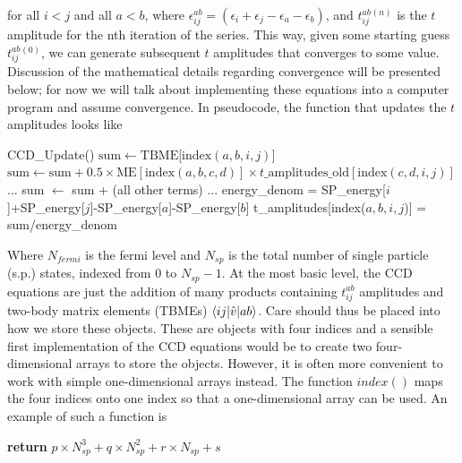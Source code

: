   for all $i < j$ and all $a < b$, where $\epsilon^{ab}_{ij} =
  \left(\epsilon_i+\epsilon_j-\epsilon_a-\epsilon_b\right)$, and
  $t_{ij}^{ab}{}^{(n)}$ is the $t$ amplitude for the nth iteration of
  the series. This way, given some starting guess
  $t_{ij}^{ab}{}^{(0)}$, we can generate subsequent $t$ amplitudes
  that converges to some value. Discussion of the mathematical details
  regarding convergence will be presented below; for now we will talk
  about implementing these equations into a computer program and
  assume convergence. In pseudocode, the function that updates the $t$
  amplitudes looks like

\begin{svgraybox}
  \begin{algorithmic} 
  \State CCD\_Update()     \State $\text{sum} \gets
  \text{TBME}[\text{index}(a,b,i,j)$]  
  \State $\text{sum} \gets \text{sum} +
  0.5\times\text{ME}[\text{index}(a,b,c,d)] \times
  t\_\text{amplitudes}\_\text{old}[\text{index}(c,d,i,j)]$ \EndFor
  \EndFor \State ...  \State sum $\gets$ sum + (all other terms)
  \State ...  \State energy\_denom =
  SP\_energy[$i$]+SP\_energy[$j$]-SP\_energy[$a$]-SP\_energy[$b$]
  \State t\_amplitudes[index($a,b,i,j$)] = sum/energy\_denom \EndFor
  \EndFor \EndFor \EndFor
  \end{algorithmic}
\end{svgraybox} 
 Where $N_{fermi}$ is the fermi level and $N_{sp}$ is the total
  number of single particle (s.p.) states, indexed from 0 to
  $N_{sp}-1$. At the most basic level, the CCD equations are just the
  addition of many products containing $t_{ij}^{ab}$ amplitudes and
  two-body matrix elements (TBMEs) $\braket{ij|\hat{v}|ab}$.
  Care should thus be placed into how we store these objects. These are
  objects with four indices and a  sensible first implementation
  of the CCD equations would be to create two four-dimensional arrays to store the
  objects. However, it is often more convenient to work with simple
  one-dimensional arrays instead. The function $index()$ maps the four
  indices onto one index so that a one-dimensional array can be used. An example
  of such a function is
\begin{svgraybox} 
 \begin{algorithmic}
   \State \textbf{return} $p\times N_{sp}^3 +
  q\times N_{sp}^2 + r\times N_{sp} + s$ \EndFunction
  \end{algorithmic}
\end{svgraybox}
